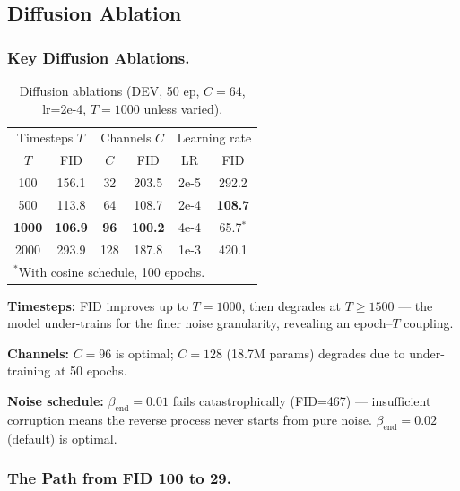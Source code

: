 \documentclass[runningheads]{llncs}
\begin{document}
\subsection{Diffusion Ablation}\label{sec:diff_ablation}

\subsubsection{Key Diffusion Ablations.}

\begin{table}[htbp]
\caption{Diffusion ablations (DEV, 50 ep, $C=64$, lr=2e-4, $T=1000$ unless varied).}\label{tab:diff_ablation}
\centering\small
\begin{tabular}{cc|cc|cc}
\toprule
\multicolumn{2}{c|}{Timesteps $T$} & \multicolumn{2}{c|}{Channels $C$} & \multicolumn{2}{c}{Learning rate} \\
$T$ & FID & $C$ & FID & LR & FID \\
\midrule
100  & 156.1 & 32  & 203.5 & 2e-5 & 292.2 \\
500  & 113.8 & 64  & 108.7 & 2e-4 & \textbf{108.7} \\
\textbf{1000} & \textbf{106.9} & \textbf{96} & \textbf{100.2} & 4e-4 & 65.7$^*$ \\
2000 & 293.9 & 128 & 187.8 & 1e-3 & 420.1 \\
\bottomrule
\multicolumn{6}{l}{\small $^*$With cosine schedule, 100 epochs.}
\end{tabular}
\end{table}

\textbf{Timesteps:} FID improves up to $T=1000$, then degrades at $T \geq 1500$ --- the model under-trains for the finer noise granularity, revealing an epoch--$T$ coupling.

\textbf{Channels:} $C=96$ is optimal; $C=128$ (18.7M params) degrades due to under-training at 50 epochs.

\textbf{Noise schedule:} $\beta_\text{end}=0.01$ fails catastrophically (FID=467) --- insufficient corruption means the reverse process never starts from pure noise. $\beta_\text{end}=0.02$ (default) is optimal.

\subsubsection{The Path from FID 100 to 29.}
\end{document}
